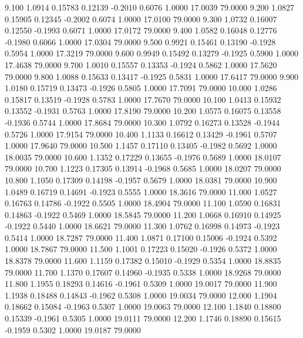    9.100   1.0914   0.15783   0.12139  -0.2010   0.6076   1.0000  17.0039  79.0000
   9.200   1.0827   0.15905   0.12345  -0.2002   0.6074   1.0000  17.0100  79.0000
   9.300   1.0732   0.16007   0.12550  -0.1993   0.6071   1.0000  17.0172  79.0000
   9.400   1.0582   0.16048   0.12776  -0.1980   0.6066   1.0000  17.0304  79.0000
   9.500   0.9921   0.15461   0.13190  -0.1928   0.5954   1.0000  17.3219  79.0000
   9.600   0.9949   0.15492   0.13279  -0.1925   0.5900   1.0000  17.4638  79.0000
   9.700   1.0010   0.15557   0.13353  -0.1924   0.5862   1.0000  17.5620  79.0000
   9.800   1.0088   0.15633   0.13417  -0.1925   0.5831   1.0000  17.6417  79.0000
   9.900   1.0180   0.15719   0.13473  -0.1926   0.5805   1.0000  17.7091  79.0000
  10.000   1.0286   0.15817   0.13519  -0.1928   0.5783   1.0000  17.7670  79.0000
  10.100   1.0413   0.15932   0.13552  -0.1931   0.5763   1.0000  17.8190  79.0000
  10.200   1.0575   0.16075   0.13558  -0.1936   0.5744   1.0000  17.8684  79.0000
  10.300   1.0792   0.16273   0.13528  -0.1944   0.5726   1.0000  17.9154  79.0000
  10.400   1.1133   0.16612   0.13429  -0.1961   0.5707   1.0000  17.9640  79.0000
  10.500   1.1457   0.17110   0.13405  -0.1982   0.5692   1.0000  18.0035  79.0000
  10.600   1.1352   0.17229   0.13655  -0.1976   0.5689   1.0000  18.0107  79.0000
  10.700   1.1223   0.17305   0.13914  -0.1968   0.5685   1.0000  18.0207  79.0000
  10.800   1.1050   0.17309   0.14198  -0.1957   0.5679   1.0000  18.0381  79.0000
  10.900   1.0489   0.16719   0.14691  -0.1923   0.5555   1.0000  18.3616  79.0000
  11.000   1.0527   0.16763   0.14786  -0.1922   0.5505   1.0000  18.4904  79.0000
  11.100   1.0590   0.16831   0.14863  -0.1922   0.5469   1.0000  18.5845  79.0000
  11.200   1.0668   0.16910   0.14925  -0.1922   0.5440   1.0000  18.6621  79.0000
  11.300   1.0762   0.16998   0.14973  -0.1923   0.5414   1.0000  18.7287  79.0000
  11.400   1.0871   0.17100   0.15006  -0.1924   0.5392   1.0000  18.7867  79.0000
  11.500   1.1001   0.17223   0.15020  -0.1926   0.5372   1.0000  18.8378  79.0000
  11.600   1.1159   0.17382   0.15010  -0.1929   0.5354   1.0000  18.8835  79.0000
  11.700   1.1370   0.17607   0.14960  -0.1935   0.5338   1.0000  18.9268  79.0000
  11.800   1.1955   0.18293   0.14616  -0.1961   0.5309   1.0000  19.0017  79.0000
  11.900   1.1938   0.18488   0.14843  -0.1962   0.5308   1.0000  19.0034  79.0000
  12.000   1.1904   0.18662   0.15084  -0.1963   0.5307   1.0000  19.0063  79.0000
  12.100   1.1840   0.18800   0.15339  -0.1961   0.5305   1.0000  19.0111  79.0000
  12.200   1.1746   0.18890   0.15615  -0.1959   0.5302   1.0000  19.0187  79.0000
